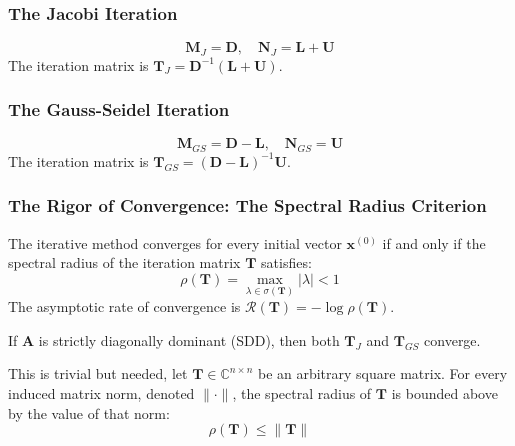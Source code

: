 \subsubsection{The Jacobi Iteration}
\begin{definition}
\[ \mathbf{M}_J = \mathbf{D}, \quad \mathbf{N}_J = \mathbf{L} + \mathbf{U} \]
The iteration matrix is $\mathbf{T}_J = \mathbf{D}^{-1}(\mathbf{L} + \mathbf{U})$.
\end{definition}

\subsubsection{The Gauss-Seidel Iteration}
\begin{definition}
\[ \mathbf{M}_{GS} = \mathbf{D} - \mathbf{L}, \quad \mathbf{N}_{GS} = \mathbf{U} \]
The iteration matrix is $\mathbf{T}_{GS} = (\mathbf{D} - \mathbf{L})^{-1}\mathbf{U}$.
\end{definition}

\subsubsection{The Rigor of Convergence: The Spectral Radius Criterion}

\begin{theorem}
The iterative method converges for every initial vector $\mathbf{x}^{(0)}$ if and only if the spectral radius of the iteration matrix $\mathbf{T}$ satisfies:
\[ \rho(\mathbf{T}) = \max_{\lambda \in \sigma(\mathbf{T})} |\lambda| < 1 \]
The asymptotic rate of convergence is $\mathcal{R}(\mathbf{T}) = -\log \rho(\mathbf{T})$.
\end{theorem}

\begin{theorem}
If $\mathbf{A}$ is strictly diagonally dominant (SDD), then both $\mathbf{T}_J$ and $\mathbf{T}_{GS}$ converge.
\end{theorem}

\begin{lemma}
This is trivial but needed, let $\mathbf{T} \in \mathbb{C}^{n \times n}$ be an arbitrary square matrix. For every induced matrix norm, denoted $\|\cdot\|$, the spectral radius of $\mathbf{T}$ is bounded above by the value of that norm:
\[ \rho(\mathbf{T}) \leq \|\mathbf{T}\| \]
\end{lemma}

